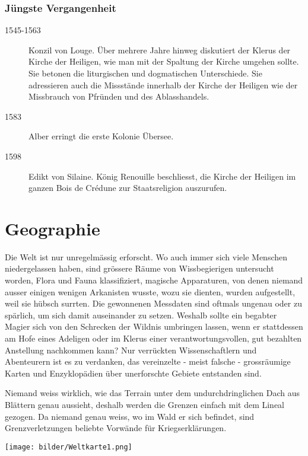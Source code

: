 \documentclass[12pt,twoside,twocolumn,openany]{book}
\begin{document}
	\subsubsection{Jüngste Vergangenheit}
	\begin{description}
		\item[1545-1563] Konzil von Louge. Über mehrere Jahre hinweg diskutiert der Klerus der Kirche der Heiligen, wie man mit der Spaltung der Kirche umgehen sollte. Sie betonen die liturgischen und dogmatischen Unterschiede. Sie adressieren auch die Missstände innerhalb der Kirche der Heiligen wie der Missbrauch von Pfründen und des Ablasshandels.
		\item[1583] Alber erringt die erste Kolonie Übersee.
		\item[1598] Edikt von Silaine. König Renouille beschliesst, die Kirche der Heiligen im ganzen Bois de Crédune zur Staatsreligion auszurufen.
	\end{description}



\section{Geographie}
Die Welt ist nur unregelmässig erforscht. Wo auch immer sich viele Menschen niedergelassen haben, sind grössere Räume von Wissbegierigen untersucht worden, Flora und Fauna klassifiziert, magische Apparaturen, von denen niemand ausser einigen wenigen Arkanisten wusste, wozu sie dienten, wurden aufgestellt, weil sie hübsch surrten. Die gewonnenen Messdaten sind oftmals ungenau oder zu spärlich, um sich damit auseinander zu setzen. Weshalb sollte ein begabter Magier sich von den Schrecken der Wildnis umbringen lassen, wenn er stattdessen am Hofe eines Adeligen oder im Klerus einer verantwortungsvollen, gut bezahlten Anstellung nachkommen kann?
Nur verrückten Wissenschaftlern und Abenteurern ist es zu verdanken, das vereinzelte - meist falsche - grossräumige Karten und Enzyklopädien über unerforschte Gebiete entstanden sind.

Niemand weiss wirklich, wie das Terrain unter dem undurchdringlichen Dach aus Blättern genau aussieht, deshalb werden die Grenzen einfach mit dem Lineal gezogen. Da niemand genau weiss, wo im Wald er sich befindet, sind Grenzverletzungen beliebte Vorwände für Kriegserklärungen.


\begin{figure*}
	\centering
	\texttt{[image: bilder/Weltkarte1.png]}
\end{figure*}
\end{document}
